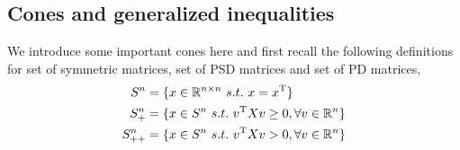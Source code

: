 %
%
%	
%	
%
%	
%
%	
%	
%	
%

\vspace{0.4cm}
\subsection{Cones and generalized inequalities}
We introduce some important cones here and first recall the following definitions for set of symmetric matrices, set of PSD matrices and set of PD matrices,
\begin{align*}
S^n &= \{x\in \mathbb{R}^{n\times n}\ s.t.\ x = x^{{\rm T}} \}\\
S^n_+ &= \{x\in S^{n}\ s.t.\ v^{{\rm T}}Xv \geq 0, \forall v\in \mathbb{R}^n \}\\
S^n_{++} &= \{x\in S^{n}\ s.t.\ v^{{\rm T}}Xv > 0 ,\forall v\in \mathbb{R}^n\}
\end{align*}


